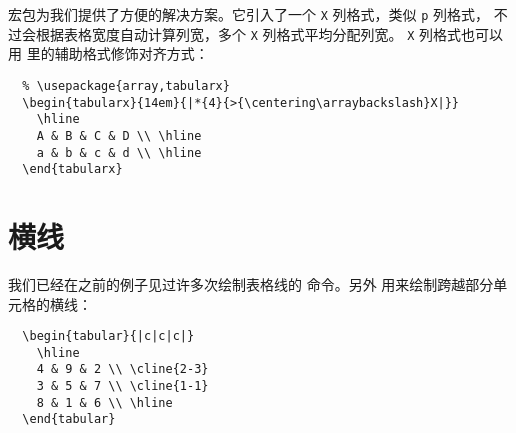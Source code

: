  宏包为我们提供了方便的解决方案。它引入了一个 \texttt{X} 列格式，类似 \texttt{p} 列格式，
不过会根据表格宽度自动计算列宽，多个 \texttt{X} 列格式平均分配列宽。
\texttt{X} 列格式也可以用  里的辅助格式修饰对齐方式：
\begin{lstlisting}
  % \usepackage{array,tabularx}
  \begin{tabularx}{14em}{|*{4}{>{\centering\arraybackslash}X|}}
    \hline
    A & B & C & D \\ \hline
    a & b & c & d \\ \hline
  \end{tabularx}
\end{lstlisting}
\begin{center}
\end{center}

\section{横线}

我们已经在之前的例子见过许多次绘制表格线的  命令。另外  用来绘制跨越部分单元格的横线：
\begin{lstlisting}
  \begin{tabular}{|c|c|c|}
    \hline
    4 & 9 & 2 \\ \cline{2-3}
    3 & 5 & 7 \\ \cline{1-1}
    8 & 1 & 6 \\ \hline
  \end{tabular}
\end{lstlisting}

\begin{center}
\end{center}


